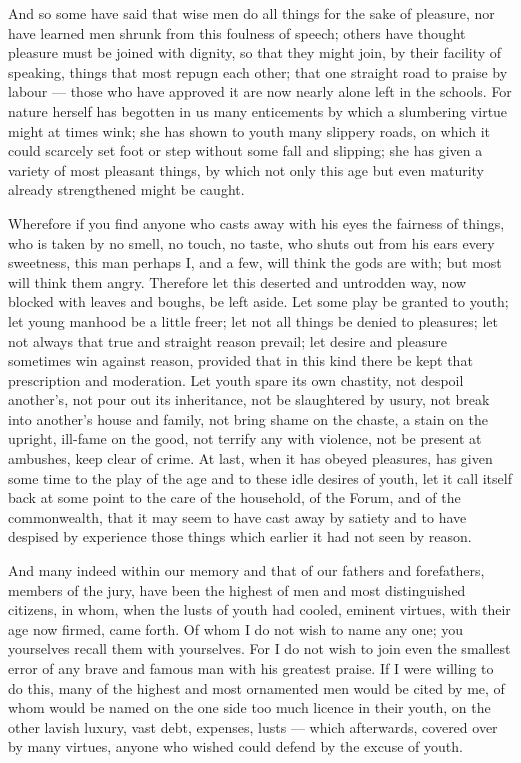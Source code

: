  And so some have said that wise men do all things for the sake of pleasure, nor have learned men shrunk from this foulness of speech; others have thought pleasure must be joined with dignity, so that they might join, by their facility of speaking, things that most repugn each other; that one straight road to praise by labour --- those who have approved it are now nearly alone left in the schools. For nature herself has begotten in us many enticements by which a slumbering virtue might at times wink; she has shown to youth many slippery roads, on which it could scarcely set foot or step without some fall and slipping; she has given a variety of most pleasant things, by which not only this age but even maturity already strengthened might be caught.

 Wherefore if you find anyone who casts away with his eyes the fairness of things, who is taken by no smell, no touch, no taste, who shuts out from his ears every sweetness, this man perhaps I, and a few, will think the gods are with; but most will think them angry. Therefore let this deserted and untrodden way, now blocked with leaves and boughs, be left aside. Let some play be granted to youth; let young manhood be a little freer; let not all things be denied to pleasures; let not always that true and straight reason prevail; let desire and pleasure sometimes win against reason, provided that in this kind there be kept that prescription and moderation. Let youth spare its own chastity, not despoil another's, not pour out its inheritance, not be slaughtered by usury, not break into another's house and family, not bring shame on the chaste, a stain on the upright, ill-fame on the good, not terrify any with violence, not be present at ambushes, keep clear of crime. At last, when it has obeyed pleasures, has given some time to the play of the age and to these idle desires of youth, let it call itself back at some point to the care of the household, of the Forum, and of the commonwealth, that it may seem to have cast away by satiety and to have despised by experience those things which earlier it had not seen by reason.

 And many indeed within our memory and that of our fathers and forefathers, members of the jury, have been the highest of men and most distinguished citizens, in whom, when the lusts of youth had cooled, eminent virtues, with their age now firmed, came forth. Of whom I do not wish to name any one; you yourselves recall them with yourselves. For I do not wish to join even the smallest error of any brave and famous man with his greatest praise. If I were willing to do this, many of the highest and most ornamented men would be cited by me, of whom would be named on the one side too much licence in their youth, on the other lavish luxury, vast debt, expenses, lusts --- which afterwards, covered over by many virtues, anyone who wished could defend by the excuse of youth.

